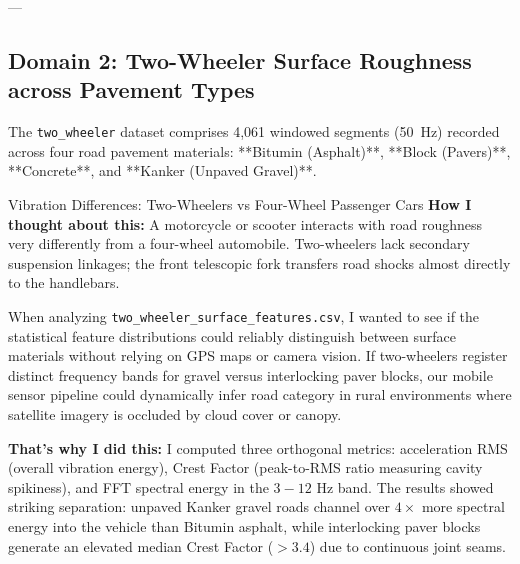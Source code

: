 ---

\subsection{Domain 2: Two-Wheeler Surface Roughness across Pavement Types}
The \texttt{two\_wheeler} dataset comprises 4,061 windowed segments (50~Hz) recorded across four road pavement materials: **Bitumin (Asphalt)**, **Block (Pavers)**, **Concrete**, and **Kanker (Unpaved Gravel)**.

\begin{designreflection}{Vibration Differences: Two-Wheelers vs Four-Wheel Passenger Cars}
\textbf{How I thought about this:}
A motorcycle or scooter interacts with road roughness very differently from a four-wheel automobile. Two-wheelers lack secondary suspension linkages; the front telescopic fork transfers road shocks almost directly to the handlebars. 

When analyzing \texttt{two\_wheeler\_surface\_features.csv}, I wanted to see if the statistical feature distributions could reliably distinguish between surface materials without relying on GPS maps or camera vision. If two-wheelers register distinct frequency bands for gravel versus interlocking paver blocks, our mobile sensor pipeline could dynamically infer road category in rural environments where satellite imagery is occluded by cloud cover or canopy.

\textbf{That's why I did this:}
I computed three orthogonal metrics: acceleration RMS (overall vibration energy), Crest Factor (peak-to-RMS ratio measuring cavity spikiness), and FFT spectral energy in the $3-12\text{ Hz}$ band. The results showed striking separation: unpaved Kanker gravel roads channel over $4\times$ more spectral energy into the vehicle than Bitumin asphalt, while interlocking paver blocks generate an elevated median Crest Factor ($>3.4$) due to continuous joint seams.
\end{designreflection}

